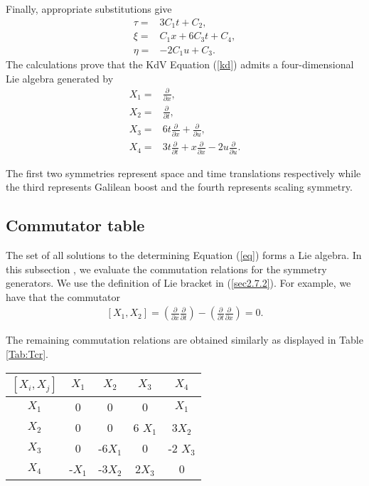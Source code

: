 Finally, appropriate substitutions give 
\begin{align}
\label{111}  \tau =& 3C_1t + C_2, \\
\label{121}  \xi = &C_1x + 6C_3t + C_4, \\
\label{131} \eta = &- 2C_1u+C_3. 
\end{align}
The  calculations  prove that the KdV Equation (\ref{kd}) admits  a four-dimensional Lie algebra generated by
\begin{align}
 \label{sec3.2.22} X_1 = &\frac{ \partial}{ \partial x},\\
\label{sec3.2.28} X_2 =& \frac{ \partial}{ \partial t},\\
 \label{sec3.2.32} X_3 =& 6t\frac{ \partial}{ \partial x } + \frac{ \partial }{ \partial u},\\
\label{sec3.2.35} X_4 =&3t \frac{ \partial }{ \partial t}+ x\frac{ \partial}{ \partial x}  - 2 u \frac{ \partial }{ \partial u}.
\end{align}
 \begin{rem}
The first two symmetries represent space and time translations respectively  while the third represents Galilean boost and the fourth represents scaling symmetry.
 \end{rem}
 \subsection{Commutator table} The set of all solutions to the determining Equation (\ref{eq}) forms a Lie algebra.
 In this subsection , we evaluate the commutation relations for the symmetry generators.  We use the definition of Lie bracket in  (\ref{sec2.7.2}). For example, we have that the commutator \begin{align}
 \left[X_1, X_2\right] = \left( \frac{ \partial}{ \partial x} \frac{ \partial}{ \partial t}\right)- \left( \frac{ \partial}{ \partial t} \frac{ \partial}{ \partial x} \right) =0.
 \end{align}
  \begin{rem}
  The remaining commutation  relations  are obtained similarly as displayed in Table   \ref{Tab:Tcr}. 
 \begin{center}
 	\begin{tabular}{|c|c|c|c|c|} 
 		\hline 
 		$[X_i,X_j]$	& $ X_1$ & $ X_2$ & $ X_3$ & $ X_4$ \\ 
 		\hline 
 		$ X_1$ & 0 & 0 & 0 & $ X_1$ \\ 
 		\hline 
 		$ X_2$ & 0 & 0 & 6 $ X_1$ & 3$ X_2$ \\ 
 		\hline 
 		$ X_3$ & 0 & -6$ X_1$ & 0 & -2 $ X_3$  \\ 
 		\hline 
 		$ X_4$ & -$X_1$ & -3$ X_2$ & 2$ X_3$ & 0 \\ 
 		\hline 
 	\end{tabular}  
 \end{center}
  \end{rem}
